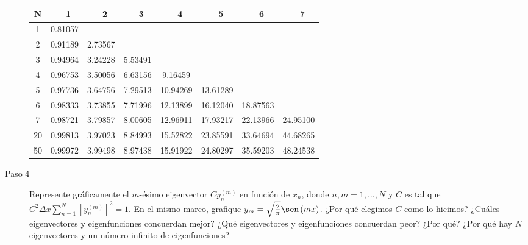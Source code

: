\begin{description}
	      \begin{table}[ht!]
		      \centering
		      \begin{tabular}{CCCCCCCC}
			      \hline
			      N  & \lambda_{1} & \lambda_{2} & \lambda_{3} & \lambda_{4} & \lambda_{5} & \lambda_{6} & \lambda_{7} \\
			        & 0.81057     &             &             &             &             &             &             \\
			      2  & 0.91189     & 2.73567     &             &             &             &             &             \\
			      3  & 0.94964     & 3.24228     & 5.53491     &             &             &             &             \\
			      4  & 0.96753     & 3.50056     & 6.63156     & 9.16459     &             &             &             \\
			      5  & 0.97736     & 3.64756     & 7.29513     & 10.94269    & 13.61289    &             &             \\
			      6  & 0.98333     & 3.73855     & 7.71996     & 12.13899    & 16.12040    & 18.87563    &             \\
			      7  & 0.98721     & 3.79857     & 8.00605     & 12.96911    & 17.93217    & 22.13966    & 24.95100    \\
			      20 & 0.99813     & 3.97023     & 8.84993     & 15.52822    & 23.85591    & 33.64694    & 44.68265    \\
			      50 & 0.99972     & 3.99498     & 8.97438     & 15.91922    & 24.80297    & 35.59203    & 48.24538    \\
			      \hline
		      \end{tabular}
	      \end{table}

	\item[Paso 4]

	      Represente gráficamente el $m$-ésimo eigenvector
	      $Cy^{\left(m\right)}_{n}$ en función de $x_{n}$, donde
	      $n,m=1,\dotsc,N$ y $C$ es tal que
	      \begin{math}
		      C^{2}\Delta x
		      \sum\limits_{n=1}^{N}\left[y^{\left(m\right)}_{n}\right]^{2}=
		      1
	      \end{math}.
	      En el mismo marco, grafique
	      $y_{m}=\sqrt{\frac{2}{\pi}}\sen\left(mx\right)$.
	      ¿Por qué elegimos $C$ como lo hicimos?
	      ¿Cuáles eigenvectores y eigenfunciones concuerdan mejor?
	      ¿Qué eigenvectores y eigenfunciones concuerdan peor?
	      ¿Por qué?
	      ¿Por qué hay $N$ eigenvectores y un número infinito de eigenfunciones?
\end{description}

